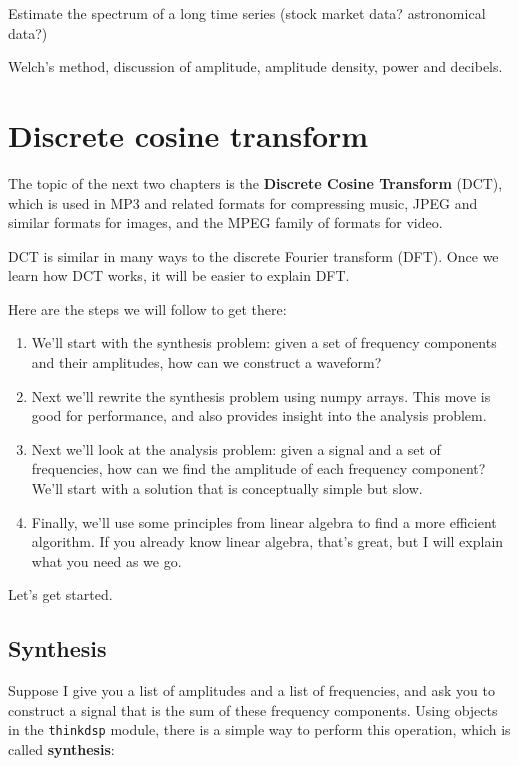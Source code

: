 \documentclass[12pt]{book}
\begin{document}
Estimate the spectrum of a long time series (stock market data?
astronomical data?)

Welch's method, discussion of amplitude, amplitude density, power
and decibels.


\chapter{Discrete cosine transform}

The topic of the next two chapters is the {\bf Discrete Cosine
  Transform} (DCT), which is used in MP3 and related formats for
compressing music, JPEG and similar formats for images, and the MPEG
family of formats for video.

DCT is similar in many ways to the discrete Fourier transform (DFT).
Once we learn how DCT works, it will be easier to explain DFT.

Here are the steps we will follow to get there:

\begin{enumerate}

\item We'll start with the synthesis problem: given a set of frequency
  components and their amplitudes, how can we construct a waveform?

\item Next we'll rewrite the synthesis problem using numpy arrays.
  This move is good for performance, and also provides insight
  into the analysis problem.

\item Next we'll look at the analysis problem: given a signal and a
  set of frequencies, how can we find the amplitude of each frequency
  component?  We'll start with a solution that is conceptually simple
  but slow.

\item Finally, we'll use some principles from linear algebra to find a
  more efficient algorithm.  If you already know linear algebra,
  that's great, but I will explain what you need as we go.

\end{enumerate}

Let's get started.


\section{Synthesis}

Suppose I give you a list of amplitudes and a list of frequencies,
and ask you to construct a signal that is the sum of these frequency
components.  Using objects in the {\tt thinkdsp} module, there is
a simple way to perform this operation, which is called {\bf synthesis}:
\end{document}
